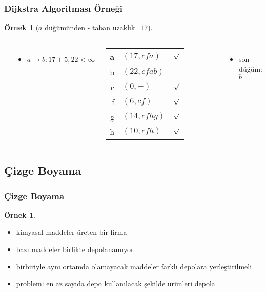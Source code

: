 \documentclass[dvipsnames]{beamer}
\theoremstyle{definition}
\theoremstyle{example}
\newtheorem{ornek}[theorem]{Örnek}
\theoremstyle{plain}
\begin{document}
\begin{frame}
  \frametitle{Dijkstra Algoritması Örneği}

  \begin{ornek}[$a$ düğümünden - taban uzaklık=$17$]
    \begin{columns}
      \begin{center}
      \end{center}

      \begin{itemize}
        \item $a \rightarrow b: 17+5, 22 < \infty$
      \end{itemize}

      \pause
      \begin{table}
        \begin{tabular}{r|l|c}
          a & $(17,cfa)$   & $\surd$ \\\hline
          b & $(22,cfab)$  & \\\hline
          c & $(0,-)$      & $\surd$ \\\hline
          f & $(6,cf)$     & $\surd$ \\\hline
          g & $(14,cfhg)$  & $\surd$ \\\hline
          h & $(10,cfh)$   & $\surd$
        \end{tabular}
      \end{table}

      \pause
      \begin{itemize}
        \item son düğüm: $b$
      \end{itemize}
    \end{columns}
  \end{ornek}
\end{frame}

\subsection{Çizge Boyama}

\begin{frame}
  \frametitle{Çizge Boyama}

  \begin{ornek}
    \begin{itemize}
      \item kimyasal maddeler üreten bir firma
      \item bazı maddeler birlikte depolanamıyor
      \item birbiriyle aynı ortamda olamayacak maddeler farklı depolara
        yerleştirilmeli

      \pause
      \medskip
      \item \alert{problem}: en az sayıda depo kullanılacak şekilde ürünleri
        depola
    \end{itemize}
  \end{ornek}
\end{frame}
\end{document}
